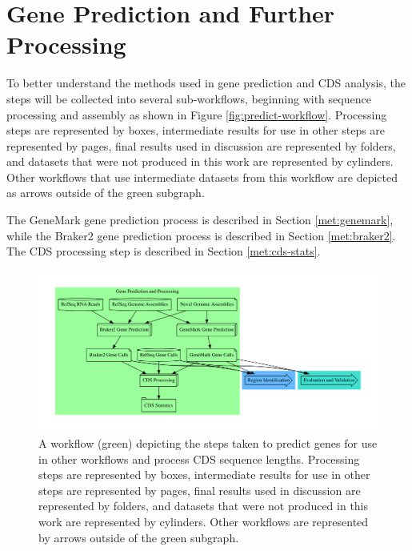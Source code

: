 

\section{Gene Prediction and Further Processing}
\label{met:predict-workflow}

To better understand the methods used in gene prediction and CDS
analysis, the steps will be collected into several sub-workflows,
beginning with sequence processing and assembly as shown in Figure
\ref{fig:predict-workflow}. Processing steps are represented by boxes,
intermediate results for use in other steps are represented by pages,
final results used in discussion are represented by folders, and
datasets that were not produced in this work are represented by
cylinders. Other workflows that use intermediate datasets from this
workflow are depicted as arrows outside of the green subgraph.

The GeneMark gene prediction process is described in Section
\ref{met:genemark}, while the Braker2 gene prediction process is
described in Section \ref{met:braker2}. The CDS processing step is
described in Section \ref{met:cds-stats}.

\begin{figure}
  \centering
  \includegraphics[width=\textwidth]{figures/gene-finding-met.pdf}
  \caption{A workflow (green) depicting the steps taken to predict
    genes for use in other workflows and process CDS sequence
    lengths. Processing steps are represented by boxes, intermediate
    results for use in other steps are represented by pages, final
    results used in discussion are represented by folders, and
    datasets that were not produced in this work are represented by
    cylinders. Other workflows are represented by arrows outside of the
    green subgraph.}
\end{figure}

